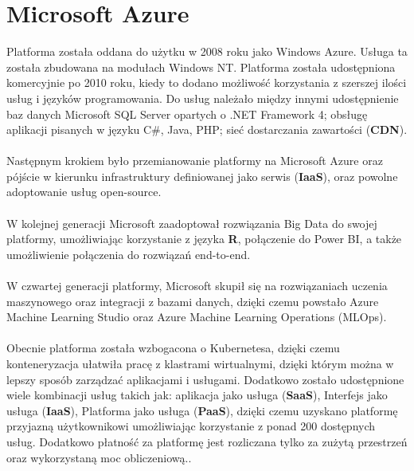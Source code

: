 \chapter{Microsoft Azure}
Platforma została oddana do użytku w 2008 roku jako Windows Azure. Usługa ta została zbudowana na modułach Windows NT. Platforma została udostępniona komercyjnie po 2010 roku, kiedy to dodano możliwość korzystania z szerszej ilości usług i języków programowania. Do usług należało między innymi udostępnienie baz danych Microsoft SQL Server opartych o .NET Framework 4; obsługę aplikacji pisanych w języku C\#, Java, PHP; sieć dostarczania zawartości (\textbf{CDN}).
\\ \\
Następnym krokiem było przemianowanie platformy na Microsoft Azure oraz pójście w kierunku infrastruktury definiowanej jako serwis (\textbf{IaaS}), oraz powolne adoptowanie usług open-source.
\\ \\
W kolejnej generacji Microsoft zaadoptował rozwiązania Big Data do swojej platformy, umożliwiając korzystanie z języka \textbf{R}, połączenie do Power BI, a także umożliwienie połączenia do rozwiązań end-to-end.
\\ \\
W czwartej generacji platformy, Microsoft skupił się na rozwiązaniach uczenia maszynowego oraz integracji z bazami danych, dzięki czemu powstało Azure Machine Learning Studio oraz Azure Machine Learning Operations (MLOps).
\\ \\
Obecnie platforma została wzbogacona o Kubernetesa, dzięki czemu konteneryzacja ułatwiła pracę z klastrami wirtualnymi, dzięki którym można w lepszy sposób zarządzać aplikacjami i usługami. Dodatkowo zostało udostępnione wiele kombinacji usług takich jak: aplikacja jako usługa  (\textbf{SaaS}), Interfejs jako usługa  (\textbf{IaaS}), Platforma jako usługa  (\textbf{PaaS}), dzięki czemu uzyskano platformę przyjazną użytkownikowi umożliwiając korzystanie z ponad 200 dostępnych usług. Dodatkowo płatność za platformę jest rozliczana tylko za zużytą przestrzeń oraz wykorzystaną moc obliczeniową.\cite{Roosevelt2022, MicrosoftAzurec, Datashift}.

